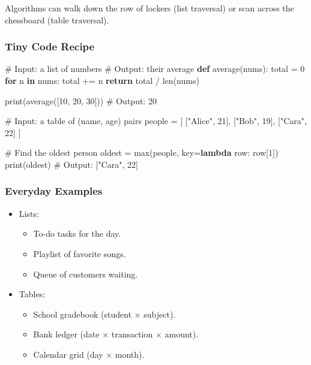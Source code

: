 \documentclass[
  letterpaper,
  DIV=11,
  numbers=noendperiod]{scrreprt}
\newenvironment{Shaded}{\begin{snugshade}}{\end{snugshade}}
\newcommand{\BuiltInTok}[1]{\textcolor[rgb]{0.00,0.23,0.31}{#1}}
\newcommand{\CommentTok}[1]{\textcolor[rgb]{0.37,0.37,0.37}{#1}}
\newcommand{\ControlFlowTok}[1]{\textcolor[rgb]{0.00,0.23,0.31}{\textbf{#1}}}
\newcommand{\DecValTok}[1]{\textcolor[rgb]{0.68,0.00,0.00}{#1}}
\newcommand{\KeywordTok}[1]{\textcolor[rgb]{0.00,0.23,0.31}{\textbf{#1}}}
\newcommand{\NormalTok}[1]{\textcolor[rgb]{0.00,0.23,0.31}{#1}}
\newcommand{\OperatorTok}[1]{\textcolor[rgb]{0.37,0.37,0.37}{#1}}
\newcommand{\StringTok}[1]{\textcolor[rgb]{0.13,0.47,0.30}{#1}}
\providecommand{\tightlist}{%
  \setlength{\itemsep}{0pt}\setlength{\parskip}{0pt}}
\begin{document}
Algorithms can walk down the row of lockers (list traversal) or scan
across the chessboard (table traversal).

\subsubsection{Tiny Code Recipe}\label{tiny-code-recipe-12}

\begin{Shaded}
\begin{Highlighting}[]
\CommentTok{\# Input: a list of numbers}
\CommentTok{\# Output: their average}
\KeywordTok{def}\NormalTok{ average(nums):}
\NormalTok{    total }\OperatorTok{=} \DecValTok{0}
    \ControlFlowTok{for}\NormalTok{ n }\KeywordTok{in}\NormalTok{ nums:}
\NormalTok{        total }\OperatorTok{+=}\NormalTok{ n}
    \ControlFlowTok{return}\NormalTok{ total }\OperatorTok{/} \BuiltInTok{len}\NormalTok{(nums)}

\BuiltInTok{print}\NormalTok{(average([}\DecValTok{10}\NormalTok{, }\DecValTok{20}\NormalTok{, }\DecValTok{30}\NormalTok{]))  }\CommentTok{\# Output: 20}

\CommentTok{\# Input: a table of (name, age) pairs}
\NormalTok{people }\OperatorTok{=}\NormalTok{ [}
\NormalTok{    [}\StringTok{"Alice"}\NormalTok{, }\DecValTok{21}\NormalTok{],}
\NormalTok{    [}\StringTok{"Bob"}\NormalTok{, }\DecValTok{19}\NormalTok{],}
\NormalTok{    [}\StringTok{"Cara"}\NormalTok{, }\DecValTok{22}\NormalTok{]}
\NormalTok{]}

\CommentTok{\# Find the oldest person}
\NormalTok{oldest }\OperatorTok{=} \BuiltInTok{max}\NormalTok{(people, key}\OperatorTok{=}\KeywordTok{lambda}\NormalTok{ row: row[}\DecValTok{1}\NormalTok{])}
\BuiltInTok{print}\NormalTok{(oldest)  }\CommentTok{\# Output: ["Cara", 22]}
\end{Highlighting}
\end{Shaded}

\subsubsection{Everyday Examples}\label{everyday-examples-12}

\begin{itemize}
\item
  Lists:

  \begin{itemize}
  \tightlist
  \item
    To-do tasks for the day.
  \item
    Playlist of favorite songs.
  \item
    Queue of customers waiting.
  \end{itemize}
\item
  Tables:

  \begin{itemize}
  \tightlist
  \item
    School gradebook (student × subject).
  \item
    Bank ledger (date × transaction × amount).
  \item
    Calendar grid (day × month).
  \end{itemize}
\end{itemize}
\end{document}

